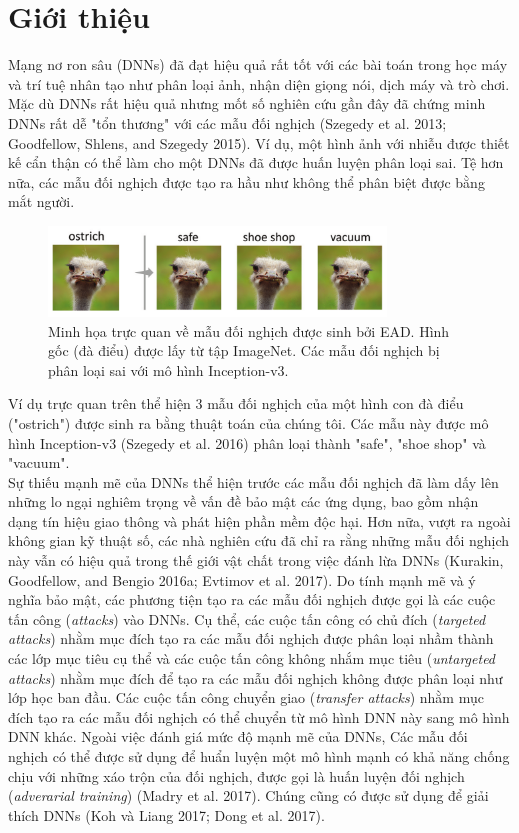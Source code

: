 \chapter{Giới thiệu}
Mạng nơ ron sâu (DNNs) đã đạt hiệu quả rất tốt với các bài toán trong học máy
và trí tuệ nhân tạo như phân loại ảnh, nhận diện giọng nói, dịch máy và trò chơi.
Mặc dù DNNs rất hiệu quả nhưng mốt số nghiên cứu gần đây đã chứng minh DNNs rất 
dễ  "tổn thương" với các mẫu đối nghịch (Szegedy et al. 2013; Goodfellow, Shlens, 
and Szegedy 2015). Ví dụ, một hình ảnh với nhiễu được thiết kế cẩn thận có thể
làm cho một DNNs đã được huấn luyện phân loại sai. Tệ hơn nữa, các mẫu đối nghịch
được tạo ra hầu như không thể phân biệt được bằng mắt người. 
\begin{figure}[H] %
    \centering %
    \includegraphics[width=0.8\textwidth]{assets/fig_01.png} 
    \caption{Minh họa trực quan về mẫu đối nghịch được sinh bởi EAD. 
    Hình gốc (đà điểu) được lấy từ tập ImageNet. Các mẫu đối nghịch bị 
    phân loại sai với mô hình Inception-v3.} %
    \label{fig:fg_01}
\end{figure}
Ví dụ trực quan trên thể hiện 3 mẫu đối nghịch của một hình con đà điểu ("ostrich") 
được sinh ra bằng thuật toán của chúng tôi. Các mẫu này được mô hình Inception-v3 
(Szegedy et al. 2016) phân loại thành "safe", "shoe shop" và "vacuum". \\

Sự thiếu mạnh mẽ của DNNs thể hiện trước các mẫu đối nghịch đã làm dấy lên những lo ngại 
nghiêm trọng về vấn đề bảo mật các ứng dụng, bao gồm nhận dạng tín hiệu giao thông 
và phát hiện phần mềm độc hại. Hơn nữa, vượt ra ngoài không gian kỹ thuật số, 
các nhà nghiên cứu đã chỉ ra rằng những mẫu đối nghịch này vẫn có hiệu quả trong thế giới 
vật chất trong việc đánh lừa DNNs (Kurakin, Goodfellow, and Bengio 2016a; Evtimov et al. 2017).
Do tính mạnh mẽ và ý nghĩa bảo mật, các phương tiện tạo ra các mẫu đối nghịch được gọi là 
các cuộc tấn công (\textit{attacks}) vào DNNs. Cụ thể, các cuộc tấn công có chủ đích 
(\textit{targeted attacks}) nhằm mục đích tạo ra các mẫu đối nghịch được phân loại nhầm thành các lớp mục tiêu 
cụ thể và các cuộc tấn công không nhắm mục tiêu (\textit{untargeted attacks}) nhằm mục đích 
để tạo ra các mẫu đối nghịch không được phân loại như lớp học ban đầu. Các cuộc tấn công 
chuyển giao (\textit{transfer attacks}) nhằm mục đích tạo ra các mẫu đối nghịch có thể chuyển 
từ mô hình DNN này sang mô hình DNN khác. Ngoài việc đánh giá mức độ mạnh mẽ của DNNs,
Các mẫu đối nghịch có thể được sử dụng để huẩn luyện một mô hình mạnh có khả năng chống chịu 
với những xáo trộn của đối nghịch, được gọi là huấn luyện đối nghịch (\textit{adverarial training}) 
(Madry et al. 2017). Chúng cũng có được sử dụng để giải thích DNNs (Koh và Liang 2017;
Dong et al. 2017). \\

